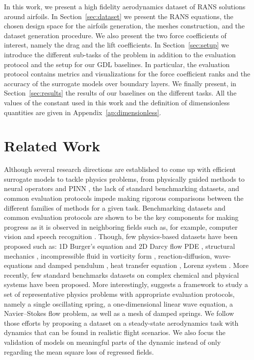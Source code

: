 In this work, we present a high fidelity aerodynamics dataset of \acrshort{RANS} solutions around airfoils. In Section~\ref{sec:dataset} we present the \acrshort{RANS} equations, the chosen design space for the airfoils generation, the meshes construction, and the dataset generation procedure. We also present the two force coefficients of interest, namely the drag and the lift coefficients. In Section~\ref{sec:setup} we introduce the different sub-tasks of the problem in addition to the evaluation protocol and the setup for our \acrshort{GDL} baselines. In particular, the evaluation protocol contains metrics and visualizations for the force coefficient ranks and the accuracy of the surrogate models over boundary layers. We finally present, in Section~\ref{sec:results} the results of our baselines on the different tasks. All the values of the constant used in this work and the definition of dimensionless quantities are given in Appendix~\ref{ap:dimensionless}.

\section{Related Work}\label{sec:related_works}
Although several research directions are established to come up with efficient surrogate models to tackle physics problems, from physically guided methods \cite{de2018deep,Chen2020,dgm,pmlr-v80-long18a,brandstetter2022lie} to neural operators \cite{mgno,Kovachki2021NeuralOL,fno,lu2021learning} and \acrfull{PINN} \cite{pinns}, the lack of standard benchmarking datasets, and common evaluation protocols impede making rigorous comparisons between the different families of methods for a given task. Benchmarking datasets and common evaluation protocols are shown to be the key components for making progress as it is observed in neighboring fields such as, for example, computer vision \cite{imagenet,Smaira2020ASN} and speech recognition \cite{pmlr-v48-amodei16}. Though, few physics-based datasets have been proposed  such as: 1D Burger’s equation and  2D Darcy flow \acrshort{PDE} \cite{mgno}, structural mechanics \cite{pfaff2021learning}, incompressible fluid in vorticity form \cite{fno}, reaction-diffusion, wave-equations and damped pendulum \cite{yin:hal-03137025}, heat transfer equation \cite{DBLP:journals/corr/abs-2010-02011}, Lorenz system \cite{dubois:hal-02475962}. More recently, few standard benchmarks datasets on complex chemical and physical systems \cite{atom3d,du2021graphgt,freitas2021a,freeman2021brax,gilpin2021chaos} have been proposed. More interestingly, \cite{otness2021an} suggests a framework to study a set of representative physics problems with appropriate evaluation protocols, namely a single oscillating spring, a one-dimensional linear wave equation, a Navier–Stokes flow problem, as well as a mesh of damped springs. We follow those efforts by proposing a dataset on a steady-state aerodynamics task with dynamics that can be found in realistic flight scenarios. We also focus the validation of models on meaningful parts of the dynamic instead of only regarding the mean square loss of regressed fields. 

